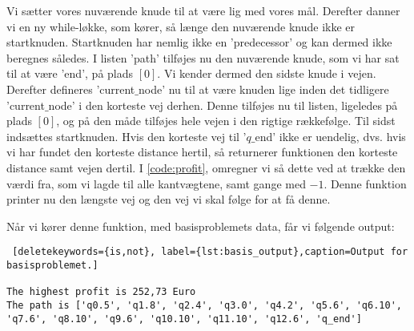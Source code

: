 Vi sætter vores nuværende knude til at være lig med vores mål.
Derefter danner vi en ny while-løkke, som kører, så længe den nuværende knude ikke er startknuden. Startknuden har nemlig ikke en 'predecessor' og kan dermed ikke beregnes således. I listen 'path' tilføjes nu den nuværende knude, som vi har sat til at være 'end', på plads $[0]$. Vi kender dermed den sidste knude i vejen. Derefter defineres 'current$\_$node' nu til at være knuden lige inden det tidligere 'current$\_$node' i den korteste vej derhen. Denne tilføjes nu til listen, ligeledes på plads $[0]$, og på den måde tilføjes hele vejen i den rigtige rækkefølge. Til sidst indsættes startknuden.
Hvis den korteste vej til '$q\_$end' ikke er uendelig, dvs. hvis vi har fundet den korteste distance hertil, så returnerer funktionen den korteste distance samt vejen dertil.
I \autoref{code:profit}, omregner vi så dette ved at trække den værdi fra, som vi lagde til alle kantvægtene, samt gange med $-1$. Denne funktion printer nu den længste vej og den vej vi skal følge for at få denne. 

 

Når vi kører denne funktion, med basisproblemets data, får vi følgende output:

\begin{lstlisting} [deletekeywords={is,not}, label={lst:basis_output},caption=Output for basisproblemet.]

The highest profit is 252,73 Euro
The path is ['q0.5', 'q1.8', 'q2.4', 'q3.0', 'q4.2', 'q5.6', 'q6.10', 'q7.6', 'q8.10', 'q9.6', 'q10.10', 'q11.10', 'q12.6', 'q_end']

\end{lstlisting}
